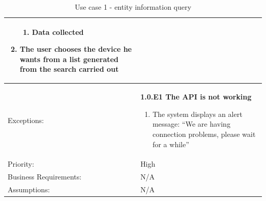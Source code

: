 \documentclass{scrreprt}
\begin{document}
\begin{table}[H]
\begin{adjustbox}{width=1.2\textwidth,center=\textwidth}
\begin{tabular}{|m{4cm}|m{12cm}|}
\begin{enumerate}
\begin{enumerate}
                    \item Data collected
                \end{enumerate}
                \item The user chooses the device he wants from a list generated from the search carried out
            \end{enumerate} \\
            \hline
            Exceptions: & \textbf{1.0.E1  The API is not working}
            \begin{enumerate}
                \item The system displays an alert message: ``We are having connection problems, please wait for a while''
            \end{enumerate} \\
            \hline
            Priority: & High \\
            \hline
            Business Requirements: & N/A \\
            \hline
            Assumptions: & N/A \\
            \hline
        \end{tabular}
    \end{adjustbox}
    \caption{Use case 1 - entity information query}
    \label{use case 1}
\end{table}
\end{document}
